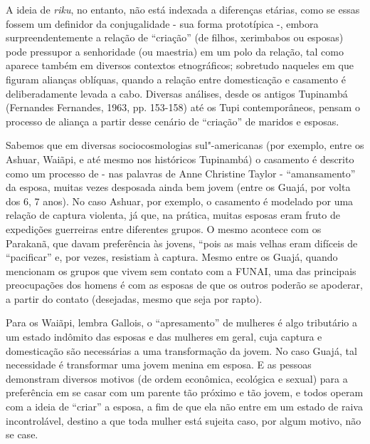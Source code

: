 A ideia de \emph{riku}, no entanto, não está indexada a diferenças
etárias, como se essas fossem um definidor da conjugalidade - sua forma
prototípica -, embora surpreendentemente a relação de ``criação'' (de
filhos, xerimbabos ou esposas) pode pressupor a senhoridade (ou
maestria) em um polo da relação, tal como aparece também em diversos
contextos etnográficos; sobretudo naqueles em que figuram alianças
oblíquas, quando a relação entre domesticação e casamento é
deliberadamente levada a cabo. Diversas análises, desde os antigos
Tupinambá (Fernandes Fernandes, 1963, pp. 153-158) até os Tupi
contemporâneos, pensam o processo de aliança a partir desse cenário de
``criação'' de maridos e esposas.

Sabemos que em diversas sociocosmologias sul"-americanas (por exemplo,
entre os Ashuar, Waiãpi, e até mesmo nos históricos Tupinambá) o
casamento é descrito como um processo de - nas palavras de Anne
Christine Taylor - ``amansamento'' da esposa, muitas vezes desposada
ainda bem jovem (entre os Guajá, por volta dos 6, 7 anos). No caso
Ashuar, por exemplo, o casamento é modelado por uma relação de captura
violenta, já que, na prática, muitas esposas eram fruto de expedições
guerreiras entre diferentes grupos. O mesmo acontece com os Parakanã,
que davam preferência às jovens, ``pois as mais velhas eram difíceis de
``pacificar'' e, por vezes, resistiam à captura. Mesmo entre os Guajá,
quando mencionam os grupos que vivem sem contato com a FUNAI, uma das
principais preocupações dos homens é com as esposas de que os outros
poderão se apoderar, a partir do contato (desejadas, mesmo que seja por
rapto).

Para os Waiãpi, lembra Gallois, o ``apresamento'' de mulheres é algo
tributário a um estado indômito das esposas e das mulheres em geral,
cuja captura e domesticação são necessárias a uma transformação da
jovem. No caso Guajá, tal necessidade é transformar uma jovem menina em
esposa. E as pessoas demonstram diversos motivos (de ordem econômica,
ecológica e sexual) para a preferência em se casar com um parente tão
próximo e tão jovem, e todos operam com a ideia de ``criar'' a esposa, a
fim de que ela não entre em um estado de raiva incontrolável, destino a
que toda mulher está sujeita caso, por algum motivo, não se case.

